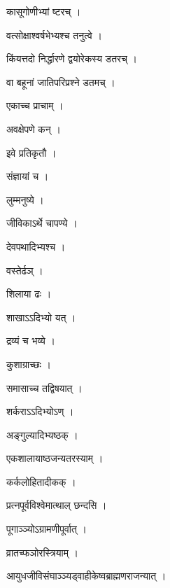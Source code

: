 \documentclass[10pt, openany, oneside]{book}
\begin{document}
\noindent कासूगोणीभ्यां ष्टरच् ।

\noindent वत्सोक्षाश्वर्षभेभ्यश्च तनुत्वे ।

\noindent किंयत्तदो निर्द्धारणे द्वयोरेकस्य डतरच् ।

\noindent वा बहूनां जातिपरिप्रश्ने डतमच् ।

\noindent एकाच्च प्राचाम् ।

\noindent अवक्षेपणे कन् ।

\noindent इवे प्रतिकृतौ ।

\noindent संज्ञायां च ।

\noindent लुम्मनुष्ये ।

\noindent जीविकाऽर्थे चापण्ये ।

\noindent देवपथादिभ्यश्च ।

\noindent वस्तेर्ढञ् ।

\noindent शिलाया ढः ।

\noindent शाखाऽऽदिभ्यो यत् ।

\noindent द्रव्यं च भव्ये ।

\noindent कुशाग्राच्छः ।

\noindent समासाच्च तद्विषयात् ।

\noindent शर्कराऽऽदिभ्योऽण् ।

\noindent अङ्गुल्यादिभ्यष्ठक् ।

\noindent एकशालायाष्ठजन्यतरस्याम् ।

\noindent कर्कलोहितादीकक् ।

\noindent प्रत्नपूर्वविश्वेमात्थाल् छन्दसि ।

\noindent पूगाञ्ञ्योऽग्रामणीपूर्वात् ।

\noindent व्रातच्फञोरस्त्रियाम् ।

\noindent आयुधजीविसंघाञ्ञ्यड्वाहीकेष्वब्राह्मणराजन्यात् ।
\end{document}
